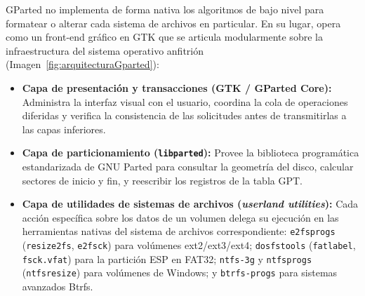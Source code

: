 \documentclass[12pt]{article}
\begin{document}
GParted no implementa de forma nativa los algoritmos de bajo nivel para formatear o alterar cada sistema de archivos en particular. En su lugar, opera como un front-end gráfico en GTK que se articula modularmente sobre la infraestructura del sistema operativo anfitrión (Imagen~\ref{fig:arquitecturaGparted}):
\begin{itemize}[noitemsep, topsep=2pt]
    \item \textbf{Capa de presentación y transacciones (GTK / GParted Core):} Administra la interfaz visual con el usuario, coordina la cola de operaciones diferidas y verifica la consistencia de las solicitudes antes de transmitirlas a las capas inferiores.
    \item \textbf{Capa de particionamiento (\texttt{libparted}):} Provee la biblioteca programática estandarizada de GNU Parted para consultar la geometría del disco, calcular sectores de inicio y fin, y reescribir los registros de la tabla GPT.
    \item \textbf{Capa de utilidades de sistemas de archivos (\textit{userland utilities}):} Cada acción específica sobre los datos de un volumen delega su ejecución en las herramientas nativas del sistema de archivos correspondiente: \texttt{e2fsprogs} (\texttt{resize2fs}, \texttt{e2fsck}) para volúmenes ext2/ext3/ext4; \texttt{dosfstools} (\texttt{fatlabel}, \texttt{fsck.vfat}) para la partición ESP en FAT32; \texttt{ntfs-3g} y \texttt{ntfsprogs} (\texttt{ntfsresize}) para volúmenes de Windows; y \texttt{btrfs-progs} para sistemas avanzados Btrfs.
\end{itemize}
\end{document}

